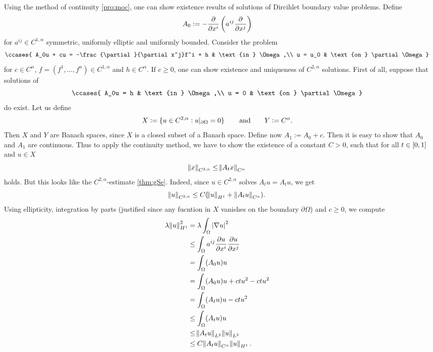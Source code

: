 Using the method of continuity \ref{pro:moc}, one can show existence results of solutions of Dircihlet boundary value problems. Define
\begin{equation*}
	A_0 := - \frac{\partial}{\partial x^i}\del[3]{a^{ij}\frac{\partial}{\partial x^j}}
\end{equation*}
\noindent for $a^{ij} \in C^{1,\alpha}$ symmetric, uniformly elliptic and uniformly bounded. Consider the problem
\begin{align*}
	\ccases{
		A_0u + cu = -\frac{\partial}{\partial x^j}f^i + h & \text{in } \Omega,\\
		u = u_0 & \text{on } \partial \Omega
	}
\end{align*}
\noindent for $c \in C^\alpha$, $f = (f^1,\dots,f^n) \in C^{1,\alpha}$ and $h \in C^\alpha$. If $c \geq 0$, one can show existence and uniqueness of $C^{2,\alpha}$ solutions. First of all, suppose that solutions of 
\begin{align*}
	\ccases{
		A_0u = h & \text{in } \Omega,\\
		u = 0 & \text{on } \partial \Omega
	}
\end{align*}
\noindent do exist. Let us define
\begin{equation*}
	X := \cbr[0]{u \in C^{2,\alpha} : u\vert_{\partial \Omega} = 0} \qquad \text{and} \qquad Y := C^\alpha.
\end{equation*}
Then $X$ and $Y$ are Banach spaces, since $X$ is a closed subset of a Banach space. Define now $A_1 := A_0 + c$. Then it is easy to show that $A_0$ and $A_1$ are continuous. Thus to apply the continuity method, we have to show the existence of a constant $C > 0$, such that for all $t \in \intcc{0,1}$ and $u \in X$
\begin{equation*}
	\norm{x}_{C^{2,\alpha}} \leq \norm{A_t x}_{C^\alpha}
\end{equation*}
\noindent holds. But this looks like the $C^{2,\alpha}$-estimate \ref{thm:gSe}. Indeed, since $u \in C^{2,\alpha}$ solves $A_t u = A_tu$, we get
\begin{equation*}
	\norm{u}_{C^{2,\alpha}} \leq C(\norm{u}_{H^1} + \norm[0]{A_tu}_{C^\alpha}).
\end{equation*}
Using ellipticity, integration by parts (justified since any fucntion in $X$ vanishes on the boundary $\partial \Omega$) and $c \geq 0$, we compute
\begin{align*}
	\lambda\norm{u}_{H^1}^2 &= \lambda\int_{\Omega}\abs[0]{\nabla u}^2\\
	&\leq \int_{\Omega} a^{ij} \frac{\partial u}{\partial x^i}\frac{\partial u}{\partial x^j}\\
	&= \int_\Omega (A_0u)u\\
	&= \int_\Omega (A_0u)u + ctu^2 - ctu^2\\
	&= \int_\Omega (A_tu)u - ctu^2\\
	&\leq \int_\Omega (A_tu)u\\
	&\leq \norm{A_tu}_{L^2}\norm{u}_{L^2}\\
	&\leq C\norm{A_tu}_{C^\alpha}\norm{u}_{H^1}.
\end{align*}

